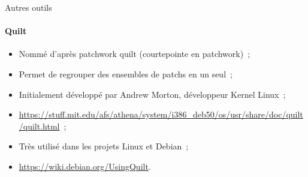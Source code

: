 \begin{frame}[fragile]{Autres outils}
\framesubtitle{Quilt}
\begin{itemize}[<+->]
 \item Nommé d'après patchwork quilt (courtepointe en patchwork)~;
 \item Permet de regrouper des ensembles de patchs en un seul~;
 \item Initialement développé par Andrew Morton, développeur Kernel Linux~;
 \item \url{https://stuff.mit.edu/afs/athena/system/i386_deb50/os/usr/share/doc/quilt/quilt.html}~;
 \item Très utilisé dans les projets Linux et Debian~;
 \item \url{https://wiki.debian.org/UsingQuilt}.
\end{itemize}
\end{frame}

